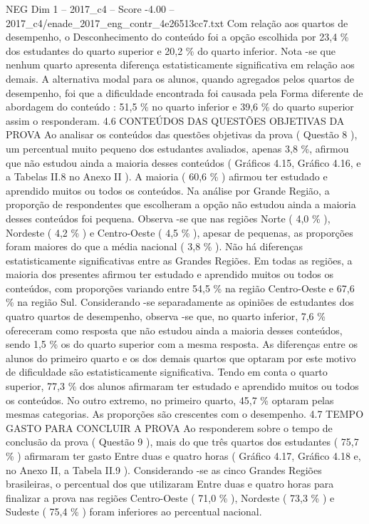 \begin{textsample}{NEG Dim 1 – 2017\_c4 – Score -4.00 – 2017\_c4/enade\_2017\_eng\_contr\_4e26513cc7.txt}
Com relação aos quartos de desempenho, o Desconhecimento do conteúdo foi a opção escolhida por 23,4 \% dos estudantes do quarto superior e 20,2 \% do quarto inferior.
Nota -se que nenhum quarto apresenta diferença estatisticamente significativa em relação aos demais.
A alternativa modal para os alunos, quando agregados pelos quartos de desempenho, foi que a dificuldade encontrada foi causada pela Forma diferente de abordagem do conteúdo : 51,5 \% no quarto inferior e 39,6 \% do quarto superior assim o responderam. 4.6 CONTEÚDOS DAS QUESTÕES OBJETIVAS DA PROVA Ao analisar os conteúdos das questões objetivas da prova ( Questão 8 ), um percentual muito pequeno dos estudantes avaliados, apenas 3,8 \%, afirmou que não estudou ainda a maioria desses conteúdos ( Gráficos 4.15, Gráfico 4.16, e a Tabelas II.8 no Anexo II ).
A maioria ( 60,6 \% ) afirmou ter estudado e aprendido muitos ou todos os conteúdos.
Na análise por Grande Região, a proporção de respondentes que escolheram a opção não estudou ainda a maioria desses conteúdos foi pequena.
Observa -se que nas regiões Norte ( 4,0 \% ), Nordeste ( 4,2 \% ) e Centro-Oeste ( 4,5 \% ), apesar de pequenas, as proporções foram maiores do que a média nacional ( 3,8 \% ).
Não há diferenças estatisticamente significativas entre as Grandes Regiões.
Em todas as regiões, a maioria dos presentes afirmou ter estudado e aprendido muitos ou todos os conteúdos, com proporções variando entre 54,5 \% na região Centro-Oeste e 67,6 \% na região Sul.
Considerando -se separadamente as opiniões de estudantes dos quatro quartos de desempenho, observa -se que, no quarto inferior, 7,6 \% ofereceram como resposta que não estudou ainda a maioria desses conteúdos, sendo 1,5 \% os do quarto superior com a mesma resposta.
As diferenças entre os alunos do primeiro quarto e os dos demais quartos que optaram por este motivo de dificuldade são estatisticamente significativa.
Tendo em conta o quarto superior, 77,3 \% dos alunos afirmaram ter estudado e aprendido muitos ou todos os conteúdos.
No outro extremo, no primeiro quarto, 45,7 \% optaram pelas mesmas categorias.
As proporções são crescentes com o desempenho. 4.7 TEMPO GASTO PARA CONCLUIR A PROVA Ao responderem sobre o tempo de conclusão da prova ( Questão 9 ), mais do que três quartos dos estudantes ( 75,7 \% ) afirmaram ter gasto Entre duas e quatro horas ( Gráfico 4.17, Gráfico 4.18 e, no Anexo II, a Tabela II.9 ).
Considerando -se as cinco Grandes Regiões brasileiras, o percentual dos que utilizaram Entre duas e quatro horas para finalizar a prova nas regiões Centro-Oeste ( 71,0 \% ), Nordeste ( 73,3 \% ) e Sudeste ( 75,4 \% ) foram inferiores ao percentual nacional.

\end{textsample}
